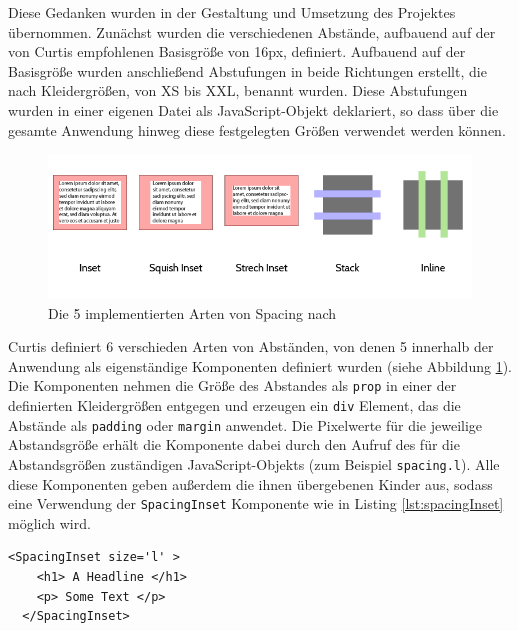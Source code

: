 Diese Gedanken wurden in der Gestaltung und Umsetzung des Projektes übernommen. Zunächst wurden die verschiedenen Abstände, aufbauend auf der von Curtis empfohlenen Basisgröße von 16px, definiert. Aufbauend auf der Basisgröße wurden anschließend Abstufungen in beide Richtungen
erstellt, die nach Kleidergrößen, von XS bis XXL, benannt wurden.
Diese Abstufungen wurden in einer eigenen Datei als JavaScript-Objekt deklariert, so dass über die gesamte Anwendung hinweg diese festgelegten Größen verwendet werden können.

\begin{figure}[h]
    \centering
    \includegraphics[width=1\textwidth]{images/spacing_types.png}
    \caption{Die 5 implementierten Arten von Spacing nach \cite{CurtisSpace16}}
    \label{fig:spacing}
\end{figure}


Curtis definiert 6 verschieden Arten von Abständen, von denen 5 innerhalb der Anwendung als eigenständige Komponenten definiert wurden (siehe Abbildung \ref{fig:spacing}).\\
Die Komponenten nehmen die Größe des Abstandes als \verb|prop| in einer der definierten Kleidergrößen entgegen und erzeugen ein \verb|div| Element, das die Abstände als \verb|padding| oder \verb|margin| anwendet.
Die Pixelwerte für die jeweilige Abstandsgröße erhält die Komponente dabei durch den Aufruf des für die Abstandsgrößen zuständigen JavaScript-Objekts (zum Beispiel \verb|spacing.l|). Alle diese Komponenten geben außerdem die ihnen übergebenen Kinder aus, sodass eine Verwendung der \verb|SpacingInset| Komponente wie in Listing \ref{lst:spacingInset} möglich wird.

\begin{lstlisting}[caption=Beispielhafte Verwendung einer Komponente für Abstände, label=lst:spacingInset]
  <SpacingInset size='l' >
    <h1> A Headline </h1>
    <p> Some Text </p>
  </SpacingInset>
\end{lstlisting}

